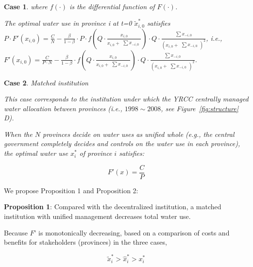 \documentclass{article}
\newtheorem{case}{Case}
\begin{document}
\begin{case}
    where $f(\cdot)$ is the differential function of $F(\cdot)$.

    The optimal water use in province i at t=0 $\widetilde x_{i,0}^*$ satisfies $P \cdot F'(x_{i,0})=\frac{C}{N}-\frac{\beta}{1-\beta} \cdot P \cdot f(Q \cdot \frac{x_{i,0}}{x_{i,0} + \begin{matrix} \sum x_{-i,0} \end{matrix}}) \cdot Q \cdot \frac{\begin{matrix} \sum x_{-i,0} \end{matrix}}{(x_{i,0} + \begin{matrix} \sum x_{-i,0} \end{matrix})^2}$, i.e., $F'(x_{i,0})=\frac{C}{P \cdot N} - \frac{\beta}{1-\beta} \cdot f(Q \cdot \frac{x_{i,0}}{x_{i,0} + \begin{matrix} \sum x_{-i,0} \end{matrix}}) \cdot Q \cdot \frac{\begin{matrix} \sum x_{-i,0} \end{matrix}}{(x_{i,0} + \begin{matrix} \sum x_{-i,0} \end{matrix})^2}$.

\end{case}

\begin{case} Matched institution

    This case corresponds to the institution under which the YRCC centrally managed water allocation between provinces (i.e., $1998\sim2008$, see Figure~\ref{fig:structure} D).

    When the $N$ provinces decide on water uses as unified whole (e.g., the central government completely decides and controls on the water use in each province), the optimal water use $x_i^*$ of province $i$ satisfies:

    $$F'(x)=\frac{C}{P}$$

\end{case}

We propose Proposition 1 and Proposition 2:

\textbf{Proposition 1}: Compared with the decentralized institution, a matched institution with unified management decreases total water use.

Because $F’$ is monotonically decreasing, based on a comparison of costs and benefits for stakeholders (provinces) in the three cases,

$$\widetilde x_i^*>\hat x_i^*>x_i^*$$
\end{document}

